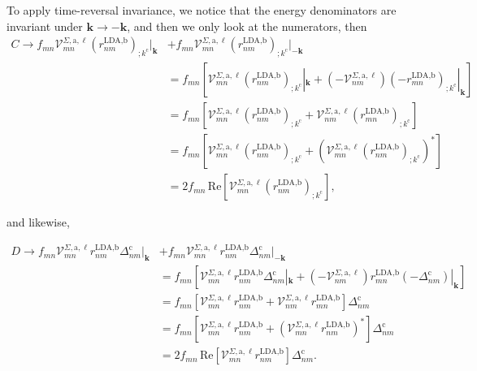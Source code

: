 To apply time-reversal invariance,
we notice that the energy denominators are 
invariant under $\mathbf{k} \rightarrow - \mathbf{k}$, 
and then we only look at the numerators, then 
\begin{align}\label{ct}
C \rightarrow f_{mn}\mathcal{V}^{\Sigma,\text{a},\ell}_{mn}
    \left(r^{\text{LDA,b}}_{nm}\right)_{;k^{\text{c}}}|_{\mathbf{k}}
&+  f_{mn}\mathcal{V}^{\Sigma,\text{a},\ell}_{mn}
    \left(r^{\text{LDA,b}}_{nm}\right)_{;k^{\text{c}}}|_{-\mathbf{k}}\nonumber\\
&=  f_{mn}\left[\mathcal{V}^{\Sigma,\text{a},\ell}_{mn}
    \left(r^{\text{LDA,b}}_{nm}\right)_{;k^{\text{c}}}|_{\mathbf{k}} 
+   \left(-\mathcal{V}^{\Sigma,\text{a},\ell}_{nm}\right)
    \left(-r^{\text{LDA,b}}_{mn}\right)_{;k^{\text{c}}}|_{\mathbf{k}}\right]
    \nonumber\\
&= f_{mn}\left[\mathcal{V}^{\Sigma,\text{a},\ell}_{mn}
    \left(r^{\text{LDA,b}}_{nm}\right)_{;k^{\text{c}}}
+   \mathcal{V}^{\Sigma,\text{a},\ell}_{nm}
    \left(r^{\text{LDA,b}}_{mn}\right)_{;k^{\text{c}}}\right]\nonumber\\
&= f_{mn}\left[\mathcal{V}^{\Sigma,\text{a},\ell}_{mn} 
    \left(r^{\text{LDA,b}}_{nm}\right)_{;k^{\text{c}}}
+   \left(\mathcal{V}^{\Sigma,\text{a},\ell}_{mn}
    \left(r^{\text{LDA,b}}_{nm}\right)_{;k^{\text{c}}}\right)^*\right]\nonumber\\
&=  2f_{mn}\,\mathrm{Re}\left[\mathcal{V}^{\Sigma,\text{a},\ell}_{mn}
    \left(r^{\text{LDA,b}}_{nm}\right)_{;k^{\text{c}}}\right]
,
\end{align}

and likewise,

\begin{align}\label{dt}
D \rightarrow f_{mn}\mathcal{V}^{\Sigma,\text{a},\ell}_{mn}
    r^{\text{LDA,b}}_{nm}\Delta^{\text{c}}_{nm}|_{\mathbf{k}} 
&+  f_{mn}\mathcal{V}^{\Sigma,\text{a},\ell}_{mn}r^{\text{LDA,b}}_{nm}
    \Delta^{\text{c}}_{nm}|_{-\mathbf{k}}\nonumber\\
&=  f_{mn}\left[\mathcal{V}^{\Sigma,\text{a},\ell}_{mn}r^{\text{LDA,b}}_{nm}
    \Delta^{\text{c}}_{nm}|_{\mathbf{k}}
+   \left(-\mathcal{V}^{\Sigma,\text{a},\ell}_{nm}\right)r^{\text{LDA,b}}_{mn}
    \left(-\Delta^{\text{c}}_{nm}\right)|_{\mathbf{k}}\right]\nonumber\\
&=  f_{mn}\left[\mathcal{V}^{\Sigma,\text{a},\ell}_{mn}r^{\text{LDA,b}}_{nm}
+   \mathcal{V}^{\Sigma,\text{a},\ell}_{nm}r^{\text{LDA,b}}_{mn}\right]
    \Delta^{\text{c}}_{nm}\nonumber\\
&=  f_{mn}\left[\mathcal{V}^{\Sigma,\text{a},\ell}_{mn}r^{\text{LDA,b}}_{nm}
+   \left(\mathcal{V}^{\Sigma,\text{a},\ell}_{mn}
    r^{\text{LDA,b}}_{nm}\right)^*\right]\Delta^{\text{c}}_{nm}\nonumber\\
&=  2f_{mn}\,\mathrm{Re}\left[\mathcal{V}^{\Sigma,\text{a},\ell}_{mn}
    r^{\text{LDA,b}}_{nm}\right]\Delta^{\text{c}}_{nm}
.
\end{align}

